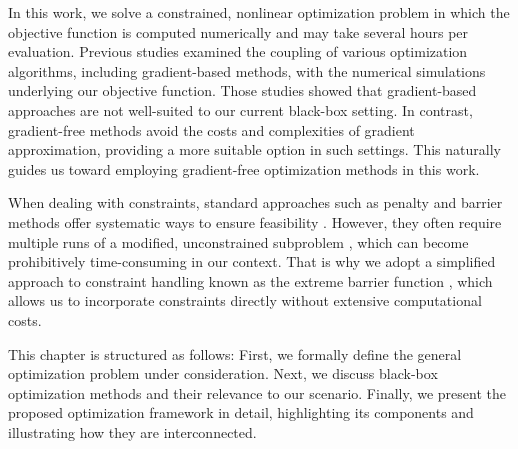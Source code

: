 In this work, we solve a constrained, nonlinear optimization problem in which the objective function is computed numerically and may take several hours per evaluation. Previous studies \cite{buresBP, buresVU} examined the coupling of various optimization algorithms, including gradient-based methods, with the numerical simulations underlying our objective function. Those studies showed that gradient-based approaches are not well-suited to our current black-box setting. In contrast, gradient-free methods avoid the costs and complexities of gradient approximation, providing a more suitable option in such settings. This naturally guides us toward employing gradient-free optimization methods in this work.

When dealing with constraints, standard approaches such as penalty and barrier methods offer systematic ways to ensure feasibility \cite{Bert}. However, they often require multiple runs of a modified, unconstrained subproblem \cite{Bert}, which can become prohibitively time-consuming in our context. That is why we adopt a simplified approach to constraint handling known as the extreme barrier function \cite{BBO-textbook}, which allows us to incorporate constraints directly without extensive computational costs.

This chapter is structured as follows: First, we formally define the general optimization problem under consideration. Next, we discuss black-box optimization methods and their relevance to our scenario. Finally, we present the proposed optimization framework in detail, highlighting its components and illustrating how they are interconnected.



